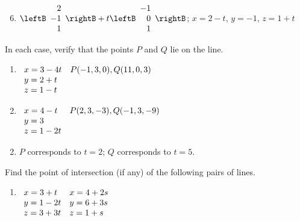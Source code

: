 \begin{multicols}{2}
\begin{ex}
\begin{sol}
\begin{enumerate}[label={\alph*.}]
\setcounter{enumi}{5}
\item 
$\leftB
\begin{array}{r}
2\\
-1\\
1
\end{array}
\rightB
+ t
\leftB
\begin{array}{r}
-1\\
0\\
1
\end{array}
\rightB$;
$x = 2 - t$, $y = -1$, $z = 1 + t$

\end{enumerate}
\end{sol}
\end{ex}

\begin{ex}
In each case, verify that the points $P$ and $Q$ lie on the line.

\begin{enumerate}[label={\alph*.}]
\item 
$\begin{array}[t]{ll}
x = 3 - 4t & P(-1,3,0), Q(11,0,3) \\
y = 2 + t & \\
z = 1 - t &
\end{array}
$

\item
$\begin{array}[t]{ll}
x = 4 - t & P(2,3,-3), Q(-1,3,-9) \\
y = 3 & \\
z = 1 - 2t &
\end{array}
$

\end{enumerate}
\begin{sol}
\begin{enumerate}[label={\alph*.}]
\setcounter{enumi}{1}
\item  $P$ corresponds to $t = 2$; $Q$ corresponds to $t = 5$.

\end{enumerate}
\end{sol}
\end{ex}

\begin{ex}
Find the point of intersection (if any) of the following pairs of lines.

\begin{enumerate}[label={\alph*.}]
\item 
$\begin{array}[t]{ll}
	x = 3 + t & x = 4 + 2s \\
	y = 1 - 2t & y = 6 + 3s \\
	z = 3 + 3t & z = 1 + s 
\end{array}$


\end{enumerate}
\end{ex}
\end{multicols}
